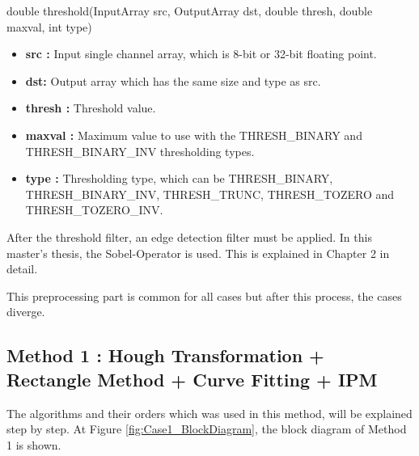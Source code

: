 \begin{center}

double threshold(InputArray src, OutputArray dst, double thresh, double maxval, int type)

\end{center}

\begin{itemize}

\item \textbf{src : }Input single channel array, which is 8-bit or 32-bit floating point.

\item \textbf{dst: }Output array which has the same size and type as src. 

\item \textbf{thresh : }Threshold value.

\item \textbf{maxval : }Maximum value to use with the THRESH\_BINARY and THRESH\_BINARY\_INV thresholding types.

\item \textbf{type : }Thresholding type, which can be THRESH\_BINARY, THRESH\_BINARY\_INV, THRESH\_TRUNC, THRESH\_TOZERO and THRESH\_TOZERO\_INV.

\end{itemize}




After the threshold filter, an edge detection filter must be applied. In this master's thesis, the Sobel-Operator is used. This is explained in Chapter 2 in detail.
 
This preprocessing part is common for all cases but after this process, the cases diverge. 
 
%
\subsection{Method 1 : Hough Transformation + Rectangle Method + Curve Fitting + IPM}\label{sec:Case 1}

The algorithms and their orders which was used in this method, will be explained step by step. At Figure \ref{fig:Case1_BlockDiagram}, the block diagram of Method 1 is shown.



